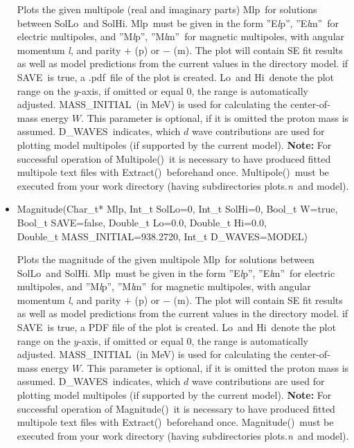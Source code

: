 \documentclass[a4paper,10pt]{article}
\def\tt{\ttfamily}
\def\rm{\rmfamily}
\begin{document}
\begin{itemize}
Plots the given multipole (real and imaginary parts) \tt Mlp\rm\ for solutions between \tt SolLo\rm\ and \tt SolHi\rm.
\tt Mlp\rm\ must be given in the form \tt ''E\textit{l}p''\rm,
\tt ''E\textit{l}m''\rm\ 
for electric multipoles, and
\tt ''M\textit{l}p''\rm,
\tt ''M\textit{l}m''\rm\ 
for magnetic multipoles, with angular momentum \tt\textit{l}\rm, and parity
$+$ (\tt p\rm) or $-$ (\tt m\rm). The plot will contain SE fit results as well as model predictions from the current
values in the directory \tt model\rm.
if \tt SAVE\rm\ is true, a \tt.pdf\rm\ file of the plot is created. \tt Lo\rm\ and \tt Hi\rm\ denote the plot range on the $y$-axis, 
if omitted or equal 0, the range is automatically adjusted.
\tt MASS\_INITIAL\rm\ (in MeV) is used for calculating the center-of-mass energy $W$. This parameter 
is optional, if it is omitted the proton mass is assumed.
\tt D\_WAVES\rm\ indicates, which $d$ wave contributions are used for plotting model multipoles (if supported by the current model).
\textbf{Note:} For successful operation of \tt Multipole()\rm\ it is necessary to have produced
fitted multipole text files with \tt Extract()\rm\ beforehand once. \tt Multipole()\rm\ must be executed from your
work directory (having subdirectories \tt plots.\textit{n}\rm\ and \tt model\rm).

\item
\tt Magnitude(Char\_t* Mlp, Int\_t SolLo=0, Int\_t SolHi=0, Bool\_t W=true,\\
\phantom{Magnitude(}Bool\_t SAVE=false, Double\_t Lo=0.0, Double\_t Hi=0.0,\\
\phantom{Magnitude(}Double\_t MASS\_INITIAL=938.2720, Int\_t D\_WAVES=MODEL)\rm

Plots the magnitude of the given multipole \tt Mlp\rm\ for solutions between \tt SolLo\rm\ and \tt SolHi\rm.
\tt Mlp\rm\ must be given in the form \tt ''E\textit{l}p''\rm,
\tt ''E\textit{l}m''\rm\ 
for electric multipoles, and
\tt ''M\textit{l}p''\rm,
\tt ''M\textit{l}m''\rm\ 
for magnetic multipoles, with angular momentum \tt\textit{l}\rm, and parity
$+$ (\tt p\rm) or $-$ (\tt m\rm). The plot will contain SE fit results as well as model predictions from the current
values in the directory \tt model\rm.
if \tt SAVE\rm\ is true, a PDF file of the plot is created. \tt Lo\rm\ and \tt Hi\rm\ denote the plot range on the $y$-axis, 
if omitted or equal 0, the range is automatically adjusted.
\tt MASS\_INITIAL\rm\ (in MeV) is used for calculating the center-of-mass energy $W$. This parameter 
is optional, if it is omitted the proton mass is assumed.
\tt D\_WAVES\rm\ indicates, which $d$ wave contributions are used for plotting model multipoles (if supported by the current model).
\textbf{Note:} For successful operation of \tt Magnitude()\rm\ it is necessary to have produced
fitted multipole text files with \tt Extract()\rm\ beforehand once. \tt Magnitude()\rm\ must be executed from your
work directory (having subdirectories \tt plots.\textit{n}\rm\ and \tt model\rm).


\end{itemize}
\end{document}
